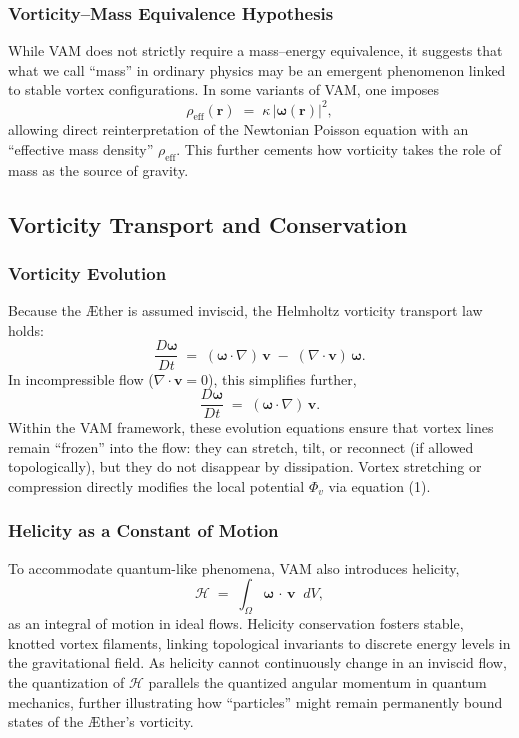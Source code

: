 \subsubsection{Vorticity–Mass Equivalence Hypothesis}

While VAM does not strictly require a mass–energy equivalence, it suggests that what we call “mass” in ordinary physics may be an emergent phenomenon linked to stable vortex configurations. In some variants of VAM, one imposes
\[
    \rho_{\mathrm{eff}}(\mathbf{r}) \;=\; \kappa \,\lvert \boldsymbol{\omega}(\mathbf{r}) \rvert^2,
\]
allowing direct reinterpretation of the Newtonian Poisson equation with an “effective mass density” \(\rho_{\mathrm{eff}}\). This further cements how vorticity takes the role of mass as the source of gravity.

\subsection{Vorticity Transport and Conservation}

\subsubsection{Vorticity Evolution}

Because the Æther is assumed inviscid, the Helmholtz vorticity transport law holds:
\[
    \frac{D \boldsymbol{\omega}}{Dt}
    \;=\;
    (\boldsymbol{\omega} \cdot \nabla)\,\mathbf{v}
    \;-\;
    (\nabla \cdot \mathbf{v})\,\boldsymbol{\omega}.
\]
In incompressible flow (\(\nabla \cdot \mathbf{v} = 0\)), this simplifies further,
\[
    \frac{D \boldsymbol{\omega}}{Dt}
    \;=\;
    (\boldsymbol{\omega} \cdot \nabla)\,\mathbf{v}.
\]
Within the VAM framework, these evolution equations ensure that vortex lines remain “frozen” into the flow: they can stretch, tilt, or reconnect (if allowed topologically), but they do not disappear by dissipation. Vortex stretching or compression directly modifies the local potential \(\Phi_v\) via equation (1).

\subsubsection{Helicity as a Constant of Motion}

To accommodate quantum-like phenomena, VAM also introduces helicity,
\[
    \mathcal{H} \;=\; \int_{\Omega} \boldsymbol{\omega} \,\cdot\, \mathbf{v} \;\;dV,
\]
as an integral of motion in ideal flows. Helicity conservation fosters stable, knotted vortex filaments, linking topological invariants to discrete energy levels in the gravitational field. As helicity cannot continuously change in an inviscid flow, the quantization of \(\mathcal{H}\) parallels the quantized angular momentum in quantum mechanics, further illustrating how “particles” might remain permanently bound states of the Æther’s vorticity.

